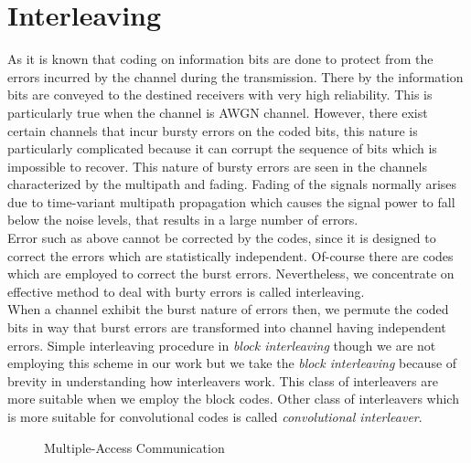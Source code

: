 \section{Interleaving}

As it is known that coding on information bits are done to protect from the errors incurred by the channel during the transmission. There by the information bits are conveyed to the destined receivers with very high reliability. This is particularly true when the channel is AWGN channel. However, there exist certain channels that incur bursty errors on the coded bits, this nature is particularly complicated because it can corrupt the sequence of bits which is impossible to recover. This nature of bursty errors are seen in the channels characterized by the multipath and fading. Fading of the signals normally arises due to time-variant multipath propagation which causes the signal power to fall below the noise levels, that results in a large number of errors. \\

Error such as above cannot be corrected by the codes, since it is designed to correct the errors which are statistically independent. Of-course there are codes which are employed to correct the burst errors. Nevertheless, we concentrate on effective method to deal with burty errors is called interleaving. \\

When a channel exhibit the burst nature of errors then, we permute the coded bits in way that burst errors are transformed into channel having independent errors. Simple interleaving procedure in \textit{block interleaving} though we are not employing this scheme in our work but we take the \textit{block interleaving} because of brevity in understanding how interleavers work. This class of interleavers are more suitable when we employ the block codes. Other class of interleavers which is more suitable for convolutional codes is called \textit{convolutional interleaver}. \\

\begin{figure}[htb]

\centerline{  }

\caption{Multiple-Access Communication}


\end{figure}

